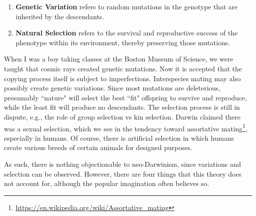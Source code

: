 \begin{enumerate}
\item \textbf{Genetic Variation} refers to random mutations in the genotype that are inherited by the descendants. 
\item \textbf{Natural Selection} refers to the survival and reproductive success of the phenotype within its environment, thereby preserving those mutations. 
\end{enumerate}
When I was a boy taking classes at the Boston Museum of Science, we were taught that cosmic rays created genetic mutations. Now it is accepted that the copying process itself is subject to imperfections. Interspecies mating may also possibly create genetic variations. Since most mutations are deleterious, presumably ``nature" will select the best ``fit" offspring to survive and reproduce, while the least fit will produce no descendants. The selection process is still in dispute, e.g., the role of group selection vs kin selection. Darwin claimed there was a sexual selection, which we see in the tendency toward assortative mating\footnote{\url{https://en.wikipedia.org/wiki/Assortative_mating}}, especially in humans. Of course, there is artificial selection in which humans create various breeds of certain animals for designed purposes.

As such, there is nothing objectionable to neo-Darwinism, since variations and selection can be observed. However, there are four things that this theory does not account for, although the popular imagination often believes so.

